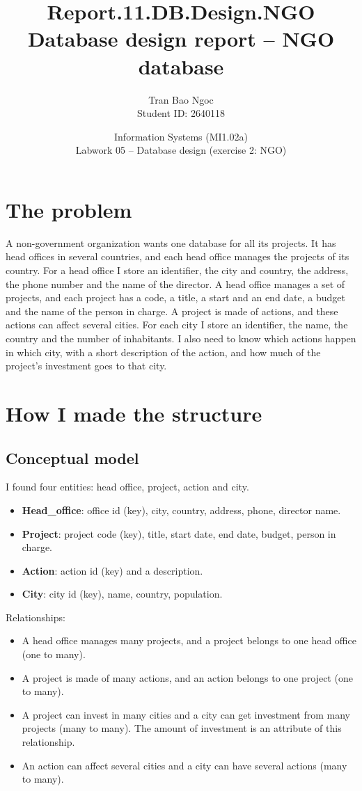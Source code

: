\documentclass[11pt,a4paper]{article}
\title{\textbf{Report.11.DB.Design.NGO}\\[0.3em]\large Database design report -- NGO database}
\author{Tran Bao Ngoc \\ Student ID: 2640118}
\date{Information Systems (MI1.02a) \\ Labwork 05 -- Database design (exercise 2: NGO)}
\begin{document}
\maketitle

\section{The problem}
A non-government organization wants one database for all its projects. It has head offices in several countries, and each head office manages the projects of its country. For a head office I store an identifier, the city and country, the address, the phone number and the name of the director. A head office manages a set of projects, and each project has a code, a title, a start and an end date, a budget and the name of the person in charge. A project is made of actions, and these actions can affect several cities. For each city I store an identifier, the name, the country and the number of inhabitants. I also need to know which actions happen in which city, with a short description of the action, and how much of the project's investment goes to that city.

\section{How I made the structure}

\subsection{Conceptual model}
I found four entities: head office, project, action and city.
\begin{itemize}
    \item \textbf{Head\_office}: office id (key), city, country, address, phone, director name.
    \item \textbf{Project}: project code (key), title, start date, end date, budget, person in charge.
    \item \textbf{Action}: action id (key) and a description.
    \item \textbf{City}: city id (key), name, country, population.
\end{itemize}

Relationships:
\begin{itemize}
    \item A head office manages many projects, and a project belongs to one head office (one to many).
    \item A project is made of many actions, and an action belongs to one project (one to many).
    \item A project can invest in many cities and a city can get investment from many projects (many to many). The amount of investment is an attribute of this relationship.
    \item An action can affect several cities and a city can have several actions (many to many).
\end{itemize}
\end{document}
